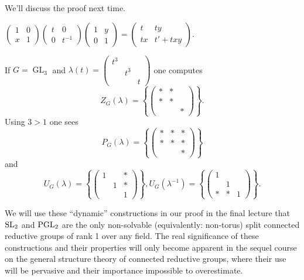 \documentclass[10pt]{article}
\renewcommand{\(}{\left(}
\renewcommand{\)}{\right)}
\numberwithin{thm}{subsection}
\begin{document}
We'll discuss the proof next time.

\begin{ex}\label{}
$\left(\begin{smallmatrix}
 1&0\\ x&1
\end{smallmatrix}\right)
\left(\begin{smallmatrix}
 t&0\\0&t^{-1}
\end{smallmatrix}\right)
\left(\begin{smallmatrix}
 1&y\\0&1
\end{smallmatrix}\right)=\left(\begin{smallmatrix}
 t&ty\\tx&t'+txy
\end{smallmatrix}\right)$.
\end{ex}
\begin{ex}\label{}
If $G=\operatorname{GL}_3$ and $\lambda(t)=\left(\begin{smallmatrix}
t^3&&\\&t^3&\\&&t 
\end{smallmatrix}\right)$
one computes
\[Z_G(\lambda)=\left\{\left(\begin{smallmatrix}
    *&*&\\
    *&*&\\
     & &*
\end{smallmatrix}\right)\right\}.\]
Using $3>1$ one sees
\[P_G(\lambda)=\left\{\left(\begin{smallmatrix}
 *&*&*\\ *&*&*\\ &&*
\end{smallmatrix}\right)\right\}\]
and
\[U_G(\lambda)=\left\{\left(\begin{smallmatrix}
 1&&*\\
&1&*\\
& & 1
\end{smallmatrix}\right)\right\},
U_G(\lambda^{-1})=\left\{\left(\begin{smallmatrix}
 1&&\\
&1&\\ 
*&*&1
\end{smallmatrix}\right)\right\}.\]
\end{ex}


We will use these ``dynamic'' constructions in our proof in the final lecture that ${\rm{SL}}_2$ and ${\rm{PGL}}_2$ are the only 
non-solvable (equivalently: non-torus) split connected reductive groups of rank 1 over any field. The
real significance of these constructions and their properties will only become apparent in the sequel course
on the general structure theory of connected reductive groups, where their use will be pervasive
and their importance impossible to overestimate.
\end{document}
